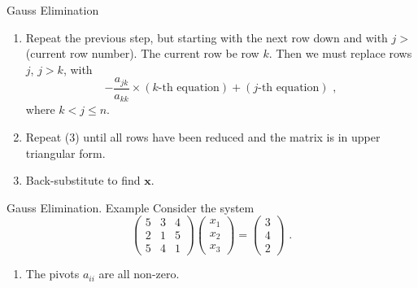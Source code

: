 \documentclass[11pt]{beamer}
\begin{document}
\begin{frame}[fragile]{Gauss Elimination}
\begin{enumerate}\addtocounter{enumi}{2}
\item Repeat the previous step, but starting with the next row down and with 
$j >$ (current row number). The current row be row $k$. Then we must replace
  rows $j$, $j > k$, with 
  \begin{equation}
    -\frac{a_{jk}}{a_{kk}} \times (k\text{-th equation}) + (j\text{-th equation})\,\,,
  \end{equation}
where $k < j \le n$.

\item Repeat (3) until all rows have been reduced and the matrix is in upper
triangular form.

\item Back-substitute to find $\mathbf{x}$.

\end{enumerate}
\end{frame}

\begin{frame}[fragile]{Gauss Elimination. Example}
Consider the system
\begin{equation}
\begin{pmatrix}
5&3&4\\
2&1&5\\
5&4&1
\end{pmatrix}
\begin{pmatrix} 
x_1\\ x_2\\ x_3  
\end{pmatrix}
= \begin{pmatrix}3\\4\\2\end{pmatrix}\,\,.
\end{equation}

\begin{enumerate}
\item The pivots $a_{ii}$ are all non-zero.
\end{enumerate}
\end{frame}
\end{document}

